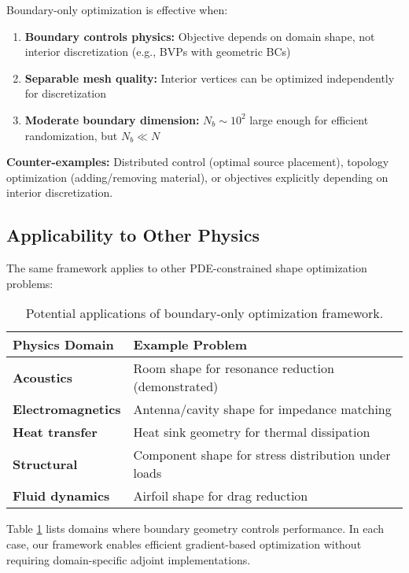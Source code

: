 \documentclass{article}
\begin{document}
Boundary-only optimization is effective when:
\begin{enumerate}
    \item \textbf{Boundary controls physics:} Objective depends on domain shape, not interior discretization (e.g., BVPs with geometric BCs)
    \item \textbf{Separable mesh quality:} Interior vertices can be optimized independently for discretization
    \item \textbf{Moderate boundary dimension:} $N_b \sim 10^2$ large enough for efficient randomization, but $N_b \ll N$
\end{enumerate}

\textbf{Counter-examples:} Distributed control (optimal source placement), topology optimization (adding/removing material), or objectives explicitly depending on interior discretization.

\subsection{Applicability to Other Physics}

The same framework applies to other PDE-constrained shape optimization problems:

\begin{table}[t]
\centering
\caption{Potential applications of boundary-only optimization framework.}
\label{tab:applications}
\small
\begin{tabular}{p{}p{}}
\toprule
\textbf{Physics Domain} & \textbf{Example Problem} \\
\midrule
\textbf{Acoustics} & Room shape for resonance reduction (demonstrated) \\
\textbf{Electromagnetics} & Antenna/cavity shape for impedance matching \\
\textbf{Heat transfer} & Heat sink geometry for thermal dissipation \\
\textbf{Structural} & Component shape for stress distribution under loads \\
\textbf{Fluid dynamics} & Airfoil shape for drag reduction \\
\bottomrule
\end{tabular}
\end{table}

Table \ref{tab:applications} lists domains where boundary geometry controls performance. In each case, our framework enables efficient gradient-based optimization without requiring domain-specific adjoint implementations.
\end{document}
